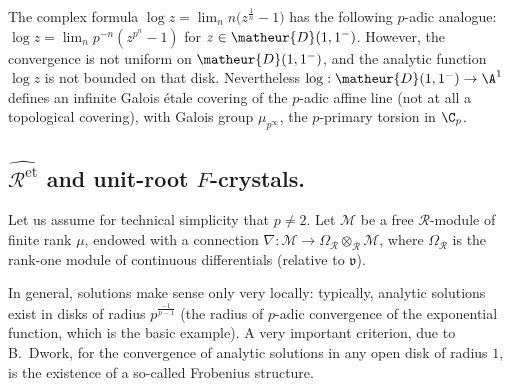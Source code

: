 \begin{rem}
 The complex formula $\log z = \lim_n n\bigl(z^\frac{1}{n}-1\bigr)$ has the
 following $p$-adic analogue: $\log z = \lim_n p^{-n}(z^{p^n}-1)$ for $z
 \in \matheur{D}(1,1^-)$. However, the convergence is not uniform on
 $\matheur{D}(1,1^-)$, and the analytic function $\log z$ is not bounded
 on that disk.  Nevertheless $\log : \matheur{D}(1,1^-) \rightarrow
 {\A}^1$ defines an infinite Galois \'etale covering of the $p$-adic
 affine line (not at all a topological covering), with Galois group
 $\mu_{p^{\infty}}$, the $p$-primary torsion in $\C_p$.
\end{rem}

\subsection{$\widehat{\mathcal{R}^{\mathrm{et}}}$ and unit-root $F$-crystals.}
\label{sub-r-and-unit-root}
\begin{para}
 Let us assume for technical simplicity that $p\neq 2$. Let $\mathcal{M}$ be
 a free $\mathcal{R}$-module of finite rank $\mu$, endowed with a connection
 $\nabla: \mathcal{M} \rightarrow
 \Omega_\mathcal{R}\otimes_\mathcal{R}\mathcal{M}$, where
 $\Omega_\mathcal{R}$ is the rank-one module of continuous differentials
 (relative to $\mathfrak{v}$).

 In general, solutions make sense only very locally: typically, analytic
 solutions exist in disks of radius $p^\frac{-1}{p-1}$ (the radius of
 $p$-adic convergence of the exponential function, which is the basic
 example).  A very important criterion, due to B.~Dwork, for the
 convergence of analytic solutions in any open disk of radius $1$, is
 the existence of a so-called Frobenius structure.
\end{para}

